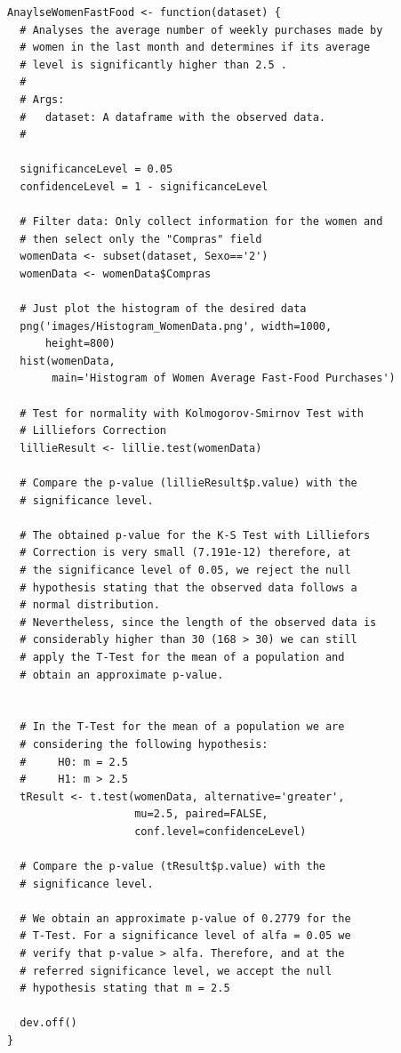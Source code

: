 \documentclass[12pt]{article}
\begin{document}
\begin{lstlisting}
AnaylseWomenFastFood <- function(dataset) {
  # Analyses the average number of weekly purchases made by
  # women in the last month and determines if its average
  # level is significantly higher than 2.5 .
  #
  # Args:
  #   dataset: A dataframe with the observed data.
  #
  
  significanceLevel = 0.05
  confidenceLevel = 1 - significanceLevel

  # Filter data: Only collect information for the women and
  # then select only the "Compras" field
  womenData <- subset(dataset, Sexo=='2')
  womenData <- womenData$Compras

  # Just plot the histogram of the desired data
  png('images/Histogram_WomenData.png', width=1000,
      height=800)
  hist(womenData,
       main='Histogram of Women Average Fast-Food Purchases')

  # Test for normality with Kolmogorov-Smirnov Test with
  # Lilliefors Correction
  lillieResult <- lillie.test(womenData)
  
  # Compare the p-value (lillieResult$p.value) with the
  # significance level.
  
  # The obtained p-value for the K-S Test with Lilliefors
  # Correction is very small (7.191e-12) therefore, at
  # the significance level of 0.05, we reject the null
  # hypothesis stating that the observed data follows a
  # normal distribution.
  # Nevertheless, since the length of the observed data is
  # considerably higher than 30 (168 > 30) we can still
  # apply the T-Test for the mean of a population and
  # obtain an approximate p-value.


  # In the T-Test for the mean of a population we are
  # considering the following hypothesis:
  #     H0: m = 2.5
  #     H1: m > 2.5
  tResult <- t.test(womenData, alternative='greater',
                    mu=2.5, paired=FALSE,
                    conf.level=confidenceLevel)
  
  # Compare the p-value (tResult$p.value) with the
  # significance level.

  # We obtain an approximate p-value of 0.2779 for the
  # T-Test. For a significance level of alfa = 0.05 we
  # verify that p-value > alfa. Therefore, and at the
  # referred significance level, we accept the null
  # hypothesis stating that m = 2.5

  dev.off()
}
\end{lstlisting}
\end{document}
